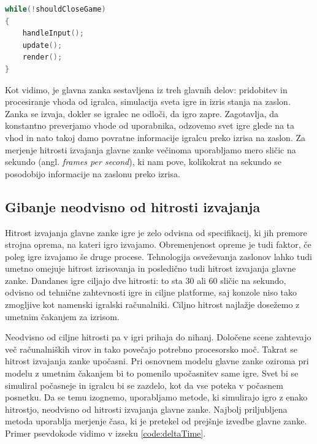 \documentclass[12pt,a4paper,twoside]{book}
\begin{document}
\begin{lstlisting}[label=code:glavnaZanka, language=C++, caption=Glavna zanka igre]
while(!shouldCloseGame)
{
	handleInput();
	update();
	render();
}
\end{lstlisting}

Kot vidimo, je glavna zanka sestavljena iz treh glavnih delov: pridobitev in procesiranje vhoda od igralca, simulacija sveta igre in izris stanja na zaslon. Zanka se izvaja, dokler se igralec ne odloči, da igro zapre. Zagotavlja, da konstantno preverjamo vhode od uporabnika, odzovemo svet igre glede na ta vhod in nato takoj damo povratne informacije igralcu preko izrisa na zaslon. Za merjenje hitrosti izvajanja glavne zanke večinoma uporabljamo mero sličic na sekundo (angl. \textit{frames per second}), ki nam pove, kolikokrat na sekundo se posodobijo informacije na zaslonu preko izrisa.

\subsection{Gibanje neodvisno od hitrosti izvajanja}
Hitrost izvajanja glavne zanke igre je zelo odvisna od specifikacij, ki jih premore strojna oprema, na kateri igro izvajamo. Obremenjenost opreme je tudi faktor, če poleg igre izvajamo še druge procese. Tehnologija osveževanja zaslonov lahko tudi umetno omejuje hitrost izrisovanja in posledično tudi hitrost izvajanja glavne zanke. Dandanes igre ciljajo dve hitrosti: to sta 30 ali 60 sličic na sekundo, odvisno od tehnične zahtevnosti igre in ciljne platforme, saj konzole niso tako zmogljive kot namenski igralski računalniki. Ciljno hitrost najlažje dosežemo z umetnim čakanjem za izrisom. 

Neodvisno od ciljne hitrosti pa v igri prihaja do nihanj. Določene scene zahtevajo več računalniških virov in tako povečajo potrebno procesorsko moč. Takrat se hitrost izvajanja zanke upočasni. Pri osnovnem modelu glavne zanke oziroma pri modelu z umetnim čakanjem bi to pomenilo upočasnitev same igre. Svet bi se simuliral počasneje in igralcu bi se zazdelo, kot da vse poteka v počasnem posnetku. Da se temu izognemo, uporabljamo metode, ki simulirajo igro z enako hitrostjo, neodvisno od hitrosti izvajanja glavne zanke. Najbolj priljubljena metoda uporablja merjenje časa, ki je pretekel od prejšnje izvedbe glavne zanke. Primer psevdokode vidimo v izseku \ref{code:deltaTime}.
\end{document}
